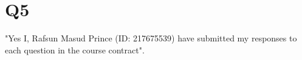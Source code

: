\documentclass{article}
\begin{document}
\section{Q5}
"Yes I, Rafsun Masud Prince (ID: 217675539) have submitted my responses to each question in the course contract".
\end{document}
